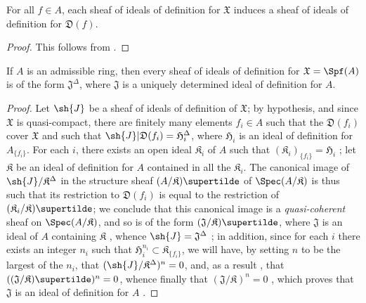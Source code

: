 \begin{proposition}[10.3.4]
\label{I.10.3.4}
For all $f\in A$, each sheaf of ideals of definition for $\mathfrak{X}$ induces a sheaf of ideals of definition for $\mathfrak{D}(f)$.
\end{proposition}

\begin{proof}
This follows from .
\end{proof}

\begin{proposition}[10.3.5]
\label{I.10.3.5}
If $A$ is an admissible ring, then every sheaf of ideals of definition for $\mathfrak{X}=\Spf(A)$ is of the form $\mathfrak{J}^\Delta$, where $\mathfrak{J}$ is a uniquely determined ideal of definition for $A$.
\end{proposition}

\begin{proof}
Let $\sh{J}$ be a sheaf of ideals of definition of $\mathfrak{X}$; by hypothesis, and since $\mathfrak{X}$ is quasi-compact, there are finitely many elements $f_i\in A$ such that the $\mathfrak{D}(f_i)$ cover $\mathfrak{X}$ and such that $\sh{J}|\mathfrak{D}(f_i)=\mathfrak{H}_i^\Delta$, where $\mathfrak{H}_i$ is an ideal of definition for $A_{\{f_i\}}$.
For each $i$, there exists an open ideal $\mathfrak{K}_i$ of $A$ such that $(\mathfrak{K}_i)_{\{f_i\}}=\mathfrak{H}_i$ ; let $\mathfrak{K}$ be an ideal of definition for $A$ contained in all the $\mathfrak{K}_i$.
The canonical image of $\sh{J}/\mathfrak{K}^\Delta$ in the structure sheaf $(A/\mathfrak{K})\supertilde$ of $\Spec(A/\mathfrak{K})$  is thus such that its restriction to $\mathfrak{D}(f_i)$ is equal to the restriction of $(\mathfrak{K}_i/\mathfrak{K})\supertilde$;
we conclude that this canonical image is a \emph{quasi-coherent} sheaf on $\Spec(A/\mathfrak{K})$, and so is of the form $(\mathfrak{J}/\mathfrak{K})\supertilde$, where $\mathfrak{J}$ is an ideal of $A$ containing $\mathfrak{K}$ , whence $\sh{J}=\mathfrak{J}^\Delta$ ;
in addition, since for each $i$ there exists an integer $n_i$ such that $\mathfrak{H}_i^{n_i}\subset\mathfrak{K}_{\{f_i\}}$, we will have, by setting $n$ to be the largest of the $n_i$, that $(\sh{J}/\mathfrak{K}^\Delta)^n=0$, and, as a result , that $((\mathfrak{J}/\mathfrak{K})\supertilde)^n=0$, whence finally that $(\mathfrak{J}/\mathfrak{K})^n=0$ , which proves that $\mathfrak{J}$ is an ideal of definition for $A$ .
\end{proof}

